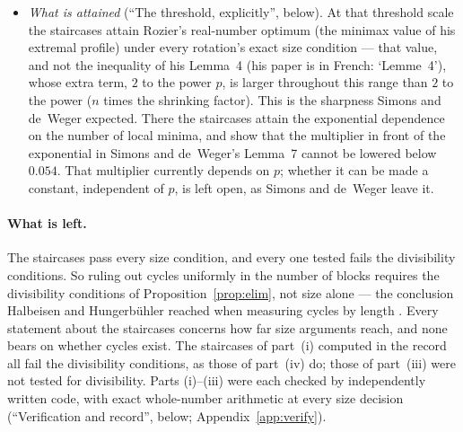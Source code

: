 \documentclass[11pt]{article}
\theoremstyle{remark}
\begin{document}
\begin{itemize}
The threshold $p_1(X_0)$ is computed from the best whole-number fractions approximating $1.585\ldots$ (its continued fraction). It never decreases as $X_0$ grows. Sample values: $10$ when $X_0$ is at most $16$; $22$ when $X_0$ is between $2^8$ and $2^{12}$; $36$ at $2^{20}$; $98$ at the threshold Simons and de~Weger used, $5$ times $2^{60}$; $110$ at $2^{71}$; and $309$ at $2^{200}$. (These are samples, not a complete table; the record computes $p_1(X_0)$ at every power of $2$ up to $2^{200}$.) No single formula covering every $X_0$ is claimed, and nothing is claimed below $p_1(X_0)$.
\item \emph{What is attained} (``The threshold, explicitly'', below). At that threshold scale the staircases attain Rozier's real-number optimum (the minimax value of his extremal profile) under every rotation's exact size condition --- that value, and not the inequality of his Lemma~4 (his paper is in French: `Lemme~4'), whose extra term, $2$ to the power $p$, is larger throughout this range than $2$ to the power ($n$ times the shrinking factor). This is the sharpness Simons and de~Weger expected. There the staircases attain the exponential dependence on the number of local minima, and show that the multiplier in front of the exponential in Simons and de~Weger's Lemma~7 cannot be lowered below $0.054$. That multiplier currently depends on $p$; whether it can be made a constant, independent of $p$, is left open, as Simons and de~Weger leave it.
\end{itemize}

\paragraph{What is left.} The staircases pass every size condition, and every one tested fails the divisibility conditions. So ruling out cycles uniformly in the number of blocks requires the divisibility conditions of Proposition~\ref{prop:elim}, not size alone --- the conclusion Halbeisen and Hungerb\"uhler reached when measuring cycles by length \cite{hh}. Every statement about the staircases concerns how far size arguments reach, and none bears on whether cycles exist. The staircases of part~(i) computed in the record all fail the divisibility conditions, as those of part~(iv) do; those of part~(iii) were not tested for divisibility. Parts (i)--(iii) were each checked by independently written code, with exact whole-number arithmetic at every size decision (``Verification and record'', below; Appendix~\ref{app:verify}).
\end{document}
